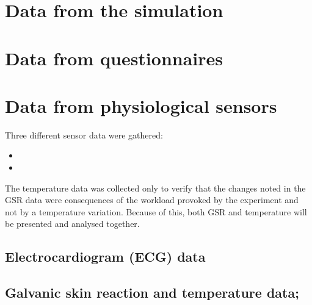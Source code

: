 \section{Data from the simulation}



\section{Data from questionnaires}



\section{Data from physiological sensors}

Three different sensor data were gathered:
\begin{itemize}
    \item {}
    \item {}
\end{itemize}

The temperature data was collected only to verify that the changes noted in the GSR data were consequences of the workload provoked by the experiment and not by a temperature variation. Because of this, both GSR and temperature will be presented and analysed together.

\subsection{Electrocardiogram (ECG) data}
\label{subsec:results_ecg}

\subsection{Galvanic skin reaction and temperature data;}
\label{subsec:results_gsr_temp}
